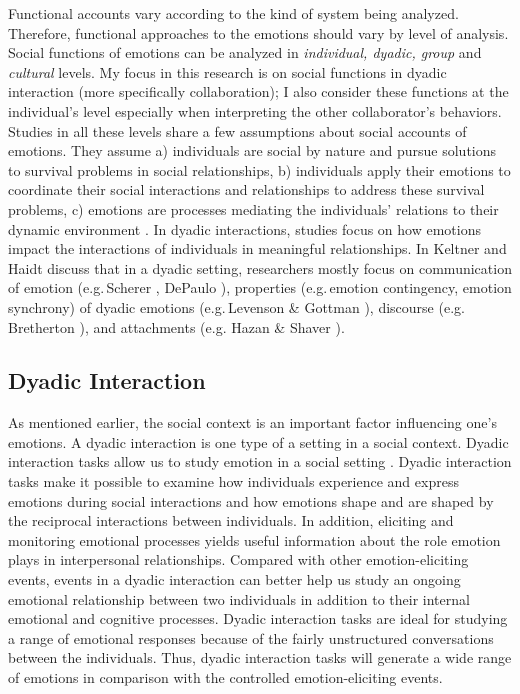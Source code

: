 \documentclass[11pt]{article}
\begin{document}
Functional accounts vary according to the kind of system being analyzed.
Therefore, functional approaches to the emotions should vary by level of
analysis. Social functions of emotions can be analyzed in \textit{individual,
dyadic, group} and \textit{cultural} levels. My focus in this research is
on social functions in dyadic interaction (more specifically collaboration); I
also consider these functions at the individual's level especially when
interpreting the other collaborator's behaviors. Studies in all these levels
share a few assumptions about social accounts of emotions. They assume a)
individuals are social by nature and pursue solutions to survival problems in
social relationships, b) individuals apply their emotions to coordinate their
social interactions and relationships to address these survival problems, c)
emotions are processes mediating the individuals' relations to their dynamic
environment \cite{keltner:emotion-functions}. In dyadic interactions, studies
focus on how emotions impact the interactions of individuals in meaningful
relationships. In \cite{keltner:emotion-functions} Keltner and Haidt discuss
that in a dyadic setting, researchers mostly focus on communication of emotion
(e.g.\,Scherer \cite{scherer:vocal-expression}, DePaulo
\cite{depaulo:nonverbal-behavior}), properties (e.g.\,emotion contingency,
emotion synchrony) of dyadic emotions (e.g.\,Levenson \& Gottman
\cite{levenson:affective-exchange}), discourse (e.g.\,Bretherton
\cite{bretherton:emotions-functionalist}), and attachments (e.g. Hazan \& Shaver
\cite{hazan:emotion-attachment}).

\subsection{Dyadic Interaction}

As mentioned earlier, the social context is an important factor influencing
one's emotions. A dyadic interaction is one type of a setting in a social
context. Dyadic interaction tasks allow us to study emotion in a social setting
\cite{coan:emotion-dyadic}. Dyadic interaction tasks make it possible to examine
how individuals experience and express emotions during social interactions and
how emotions shape and are shaped by the reciprocal interactions between
individuals. In addition, eliciting and monitoring emotional processes yields
useful information about the role emotion plays in interpersonal relationships.
Compared with other emotion-eliciting events, events in a dyadic interaction can
better help us study an ongoing emotional relationship between two individuals
in addition to their internal emotional and cognitive processes. Dyadic
interaction tasks are ideal for studying a range of emotional responses because
of the fairly unstructured conversations between the individuals. Thus, dyadic
interaction tasks will generate a wide range of emotions in comparison with the
controlled emotion-eliciting events.
\end{document}
